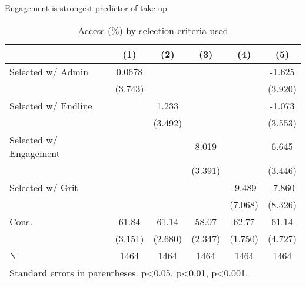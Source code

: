 \documentclass[aspectratio=169, handout, sectionslides]{padajar-slides} %
\begin{document}
\begin{frame}{Engagement is strongest predictor of take-up}
	\begin{center}
			\begin{table}[htbp]\centering
				\small\caption{Access (\%) by selection criteria used}
				\footnotesize\begin{tabular}{l*{5}{c}}
					&\multicolumn{1}{c}{(1)}         &\multicolumn{1}{c}{(2)}         &\multicolumn{1}{c}{(3)}         &\multicolumn{1}{c}{(4)}         &\multicolumn{1}{c}{(5)}         \\
					\hline
					Selected w/ Admin&      0.0678         &                     &                     &                     &      -1.625         \\
					&     (3.743)         &                     &                     &                     &     (3.920)         \\
					Selected w/ Endline&                     &       1.233         &                     &                     &      -1.073         \\
					&                     &     (3.492)         &                     &                     &     (3.553)         \\
					\color{padajaralert}Selected w/ Engagement&                     &                     &       \color{padajaralert}8.019\sym{*}  &                     &       \color{padajaralert}6.645         \\
					&                     &                     &     \color{padajaralert}(3.391)         &                     &     \color{padajaralert}(3.446)         \\
					Selected w/ Grit&                     &                     &                     &      -9.489         &      -7.860         \\
					&                     &                     &                     &     (7.068)         &     (8.326)         \\
					Cons.       &       61.84\sym{***}&       61.14\sym{***}&       58.07\sym{***}&       62.77\sym{***}&       61.14\sym{***}\\
					&     (3.151)         &     (2.680)         &     (2.347)         &     (1.750)         &     (4.727)         \\
					\hline
					N     &        1464         &        1464         &        1464         &        1464         &        1464         \\
					\multicolumn{6}{l}{\tiny Standard errors in parentheses. \sym{*}p\textless0.05, \sym{**}p\textless0.01, \sym{***}p\textless0.001.}\\
				\end{tabular}
			\end{table}
	\end{center}
\end{frame}
\end{document}
